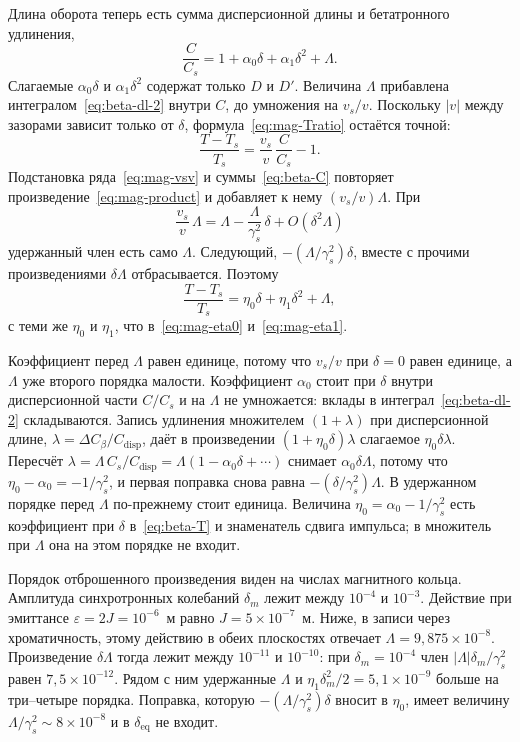 \documentclass[aps,pra,preprint,a4paper,amsmath,amssymb,longbibliography]{revtex4-2}
\begin{document}
Длина оборота теперь есть сумма дисперсионной длины и бетатронного удлинения,
\begin{equation}
\label{eq:beta-C}
\frac{C}{C_s}
=1+\alpha_0\delta+\alpha_1\delta^2+\Lambda.
\end{equation}
Слагаемые $\alpha_0\delta$ и $\alpha_1\delta^2$ содержат только $D$ и $D'$. Величина $\Lambda$ прибавлена интегралом~\eqref{eq:beta-dl-2} внутри $C$, до умножения на $v_s/v$. Поскольку $|v|$ между зазорами зависит только от $\delta$, формула~\eqref{eq:mag-Tratio} остаётся точной:
\begin{equation}
\label{eq:beta-Tratio}
\frac{T-T_s}{T_s}
=\frac{v_s}{v}\,\frac{C}{C_s}-1.
\end{equation}
Подстановка ряда~\eqref{eq:mag-vsv} и суммы~\eqref{eq:beta-C} повторяет произведение~\eqref{eq:mag-product} и добавляет к нему $(v_s/v)\Lambda$. При
\begin{equation}
\label{eq:beta-vsv-L}
\frac{v_s}{v}\,\Lambda
=\Lambda-\frac{\Lambda}{\gamma_s^2}\,\delta+O(\delta^2\Lambda)
\end{equation}
удержанный член есть само $\Lambda$. Следующий, $-(\Lambda/\gamma_s^2)\delta$, вместе с прочими произведениями $\delta\Lambda$ отбрасывается. Поэтому
\begin{equation}
\label{eq:beta-T}
\frac{T-T_s}{T_s}
=\eta_0\delta+\eta_1\delta^2+\Lambda,
\end{equation}
с теми же $\eta_0$ и $\eta_1$, что в~\eqref{eq:mag-eta0} и~\eqref{eq:mag-eta1}.

Коэффициент перед $\Lambda$ равен единице, потому что $v_s/v$ при $\delta=0$ равен единице, а $\Lambda$ уже второго порядка малости. Коэффициент $\alpha_0$ стоит при $\delta$ внутри дисперсионной части $C/C_s$ и на $\Lambda$ не умножается: вклады в интеграл~\eqref{eq:beta-dl-2} складываются. Запись удлинения множителем $(1+\lambda)$ при дисперсионной длине, $\lambda=\Delta C_\beta/C_{\mathrm{disp}}$, даёт в произведении $(1+\eta_0\delta)\lambda$ слагаемое $\eta_0\delta\lambda$. Пересчёт $\lambda=\Lambda\,C_s/C_{\mathrm{disp}}=\Lambda(1-\alpha_0\delta+\cdots)$ снимает $\alpha_0\delta\Lambda$, потому что $\eta_0-\alpha_0=-1/\gamma_s^2$, и первая поправка снова равна $-(\delta/\gamma_s^2)\Lambda$. В удержанном порядке перед $\Lambda$ по-прежнему стоит единица. Величина $\eta_0=\alpha_0-1/\gamma_s^2$ есть коэффициент при $\delta$ в~\eqref{eq:beta-T} и знаменатель сдвига импульса; в множитель при $\Lambda$ она на этом порядке не входит.

Порядок отброшенного произведения виден на числах магнитного кольца. Амплитуда синхротронных колебаний $\delta_m$ лежит между $10^{-4}$ и $10^{-3}$. Действие при эмиттансе $\varepsilon=2J=10^{-6}$~м равно $J=5\times 10^{-7}$~м. Ниже, в записи через хроматичность, этому действию в обеих плоскостях отвечает $\Lambda=9{,}875\times 10^{-8}$. Произведение $\delta\Lambda$ тогда лежит между $10^{-11}$ и $10^{-10}$: при $\delta_m=10^{-4}$ член $|\Lambda|\delta_m/\gamma_s^2$ равен $7{,}5\times 10^{-12}$. Рядом с ним удержанные $\Lambda$ и $\eta_1\delta_m^2/2=5{,}1\times 10^{-9}$ больше на три--четыре порядка. Поправка, которую $-(\Lambda/\gamma_s^2)\delta$ вносит в $\eta_0$, имеет величину $\Lambda/\gamma_s^2\sim 8\times 10^{-8}$ и в $\delta_{\mathrm{eq}}$ не входит.
\end{document}
